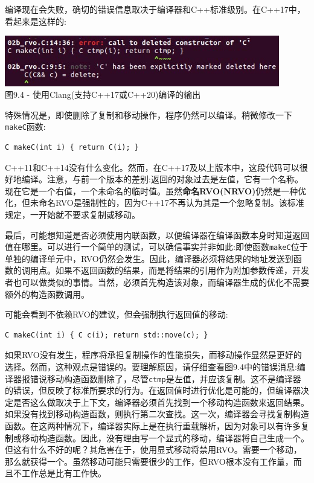 编译现在会失败，确切的错误信息取决于编译器和C++标准级别。在C++17中，看起来是这样的:

\begin{center}
\includegraphics[width=0.9\textwidth]{content/3/chapter9/images/4.jpg}\\
图9.4 - 使用Clang(支持C++17或C++20)编译的输出
\end{center}

特殊情况是，即使删除了复制和移动操作，程序仍然可以编译。稍微修改一下\texttt{makeC}函数:

\begin{lstlisting}[style=styleCXX]
C makeC(int i) { return C(i); }
\end{lstlisting}

C++11和C++14没有什么变化。然而，在C++17及以上版本中，这段代码可以很好地编译。注意，与前一个版本的差别:返回的对象过去是左值，它有一个名称。现在它是一个右值，一个未命名的临时值。虽然\textbf{命名RVO(NRVO)}仍然是一种优化，但未命名RVO是强制性的，因为C++17不再认为其是一个忽略复制。该标准规定，一开始就不要求复制或移动。 

最后，可能想知道是否必须使用内联函数，以便编译器在编译函数本身时知道返回值在哪里。可以进行一个简单的测试，可以确信事实并非如此:即使函数\texttt{makeC}位于单独的编译单元中，RVO仍然会发生。因此，编译器必须将结果的地址发送到函数的调用点。如果不返回函数的结果，而是将结果的引用作为附加参数传递，开发者也可以做类似的事情。当然，必须首先构造该对象，而编译器生成的优化不需要额外的构造函数调用。 

可能会看到不依赖RVO的建议，但会强制执行返回值的移动:

\begin{lstlisting}[style=styleCXX]
C makeC(int i) { C c(i); return std::move(c); }
\end{lstlisting}

如果RVO没有发生，程序将承担复制操作的性能损失，而移动操作显然是更好的选择。然而，这种观点是错误的。要理解原因，请仔细查看图9.4中的错误消息:编译器报错说移动构造函数删除了，尽管\texttt{ctmp}是左值，并应该复制。这不是编译器的错误，但反映了标准所要求的行为。在返回值时进行优化是可能的，但编译器决定是否这么做取决于上下文，编译器必须首先找到一个移动构造函数来返回结果。如果没有找到移动构造函数，则执行第二次查找。这一次，编译器会寻找复制构造函数。在这两种情况下，编译器实际上是在执行重载解析，因为对象可以有许多复制或移动构造函数。因此，没有理由写一个显式的移动，编译器将自己生成一个。但这有什么不好的呢？其危害在于，使用显式移动将禁用RVO。需要一个移动，那么就获得一个。虽然移动可能只需要很少的工作，但RVO根本没有工作量，而且不工作总是比有工作快。

